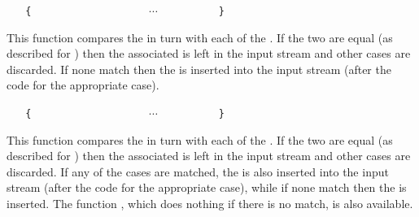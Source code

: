 \documentclass[oneside]{book}
\begin{document}
\begin{function}{\TlVarCaseF}
\begin{syntax}
 
~ ~ \verb"{"
~ ~ ~ ~  
~ ~ ~ ~  
~ ~ ~ ~ $\cdots$
~ ~ ~ ~  
~ ~ \verb"}"
~ ~ 
\end{syntax}
This function compares the  in turn
with each of the . If the two
are equal (as described for )
then the associated  is left in the input
stream and other cases are discarded. If none match then the 
is inserted into the input stream (after the code for the appropriate case).
\begin{demohigh}
\IgnoreSpacesOn
\TlSet {}
\TlSet {}
\TlSet {}
\TlSet {}
\TlVarCaseF {}
\IgnoreSpacesOff
\end{demohigh}
\end{function}

\begin{function}{\TlVarCaseTF}
\begin{syntax}
 
~ ~ \verb"{"
~ ~ ~ ~  
~ ~ ~ ~  
~ ~ ~ ~ $\cdots$
~ ~ ~ ~  
~ ~ \verb"}"
~ ~ 
~ ~ 
\end{syntax}
This function compares the  in turn
with each of the . If the two
are equal (as described for )
then the associated  is left in the input
stream and other cases are discarded. If any of the
cases are matched, the  is also inserted into the
input stream (after the code for the appropriate case), while if none
match then the  is inserted. The function ,
which does nothing if there is no match, is also available.
\begin{demohigh}
\IgnoreSpacesOn
\TlSet {}
\TlSet {}
\TlSet {}
\TlSet {}
\TlVarCaseTF {}
\IgnoreSpacesOff
\end{demohigh}
\end{function}
\end{document}
